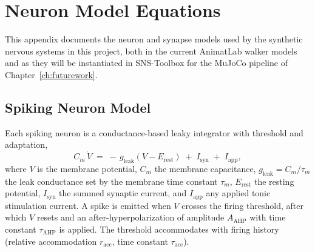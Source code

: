 
\chapter{Neuron Model Equations}\label{app:neuron_equations}

This appendix documents the neuron and synapse models used by the synthetic
nervous systems in this project, both in the current AnimatLab walker models and
as they will be instantiated in SNS-Toolbox for the MuJoCo pipeline of
Chapter~\ref{ch:futurework}.

\section{Spiking Neuron Model}

Each spiking neuron is a conductance-based leaky integrator with threshold and
adaptation,
\begin{equation}
    C_{m}\,\dot{V} \;=\; -\,g_{\text{leak}}\left(V - E_{\text{rest}}\right)
                      \;+\; I_{\text{syn}} \;+\; I_{\text{app}},
    \label{eq:app_membrane}
\end{equation}
where $V$ is the membrane potential, $C_{m}$ the membrane capacitance,
$g_{\text{leak}} = C_{m}/\tau_{m}$ the leak conductance set by the membrane time
constant $\tau_{m}$, $E_{\text{rest}}$ the resting potential, $I_{\text{syn}}$
the summed synaptic current, and $I_{\text{app}}$ any applied tonic stimulation
current. A spike is emitted when $V$ crosses the firing threshold, after which
$V$ resets and an after-hyperpolarization of amplitude $A_{\text{AHP}}$ with
time constant $\tau_{\text{AHP}}$ is applied. The threshold accommodates with
firing history (relative accommodation $r_{\text{acc}}$, time constant
$\tau_{\text{acc}}$).

